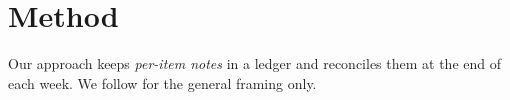 \documentclass{article}
\begin{document}
\section{Method}
Our approach keeps \emph{per-item notes} in a ledger and reconciles them at the end of each week.
We follow \citep{smith2020} for the general framing only.
\end{document}
